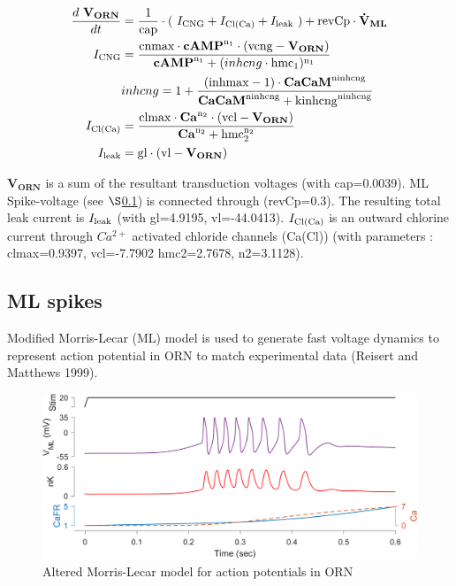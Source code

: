 \documentclass[
]{article}
\begin{document}
\begin{equation}
\begin{split}
\frac{d\ \mathbf{V_{ORN}}}{dt} &= \frac{1}{\rm cap} \cdot (\ I_{\rm CNG} + I_{\rm Cl(Ca)} + I_{\rm leak}\ ) + {\rm revCp} \cdot \mathbf{\dot{V}_{ML}} \\
I_{\rm CNG} &= \frac{{\rm cnmax} \cdot \mathbf{cAMP}^{\rm n_1} \cdot ({\rm vcng}-\mathbf{V_{ORN}})}{\mathbf{cAMP}^{\rm n_1} + (inhcng \cdot {\rm hmc_1})^{\rm n_1}} \\
& inhcng = 1 + \frac{({\rm inhmax}-1)\cdot \mathbf{CaCaM}^{\rm ninhcng}}{\mathbf{CaCaM}^{\rm ninhcng} + {\rm kinhcng}^{\rm ninhcng}} \\
I_{\rm Cl(Ca)} &= \frac{{\rm clmax} \cdot \mathbf{Ca}^{\rm n_2} \cdot ({\rm vcl} - \mathbf{V_{ORN}})}{\mathbf{Ca}^{\rm n_2} + {\rm hmc_2^{n_2}}} \\
I_{\rm leak} &= {\rm gl} \cdot ({\rm vl} - \mathbf{V_{ORN}})
\end{split}
\end{equation}

\(\mathbf{V_{ORN}}\) is a sum of the resultant transduction voltages (with cap=0.0039). ML Spike-voltage (see \(\S\)\ref{ML}) is connected through (revCp=0.3). The resulting total leak current is \(I_{\rm leak}\) (with gl=4.9195, vl=-44.0413). \(I_{\rm Cl(Ca)}\) is an outward chlorine current through \(Ca^{2+}\) activated chloride channels (Ca(Cl)) (with parameters : clmax=0.9397, vcl=-7.7902 hmc2=2.7678, n2=3.1128).

\hypertarget{ML}{%
\subsection{ML spikes}\label{ML}}

Modified Morris-Lecar (ML) model is used to generate fast voltage dynamics to represent action potential in ORN to match experimental data (Reisert and Matthews 1999).

\begin{figure}

{\centering \includegraphics[width=0.9\linewidth]{figs/v1/fig_ML_spikes} 

}

\caption{Altered Morris-Lecar model for action potentials in ORN}\label{fig:MLspk}
\end{figure}
\end{document}
